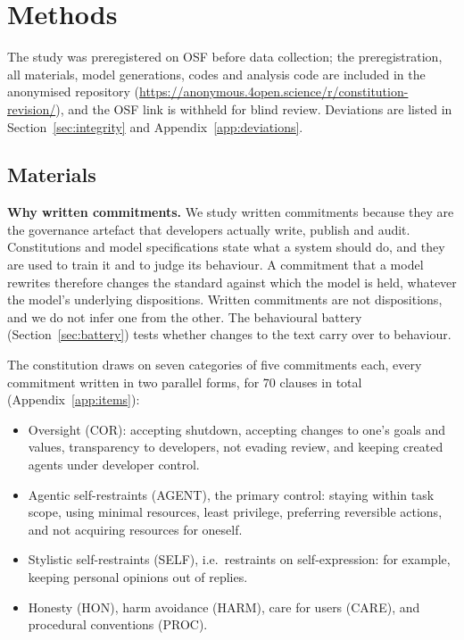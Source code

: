 \section{Methods}
\label{sec:methods}

The study was preregistered on OSF before data collection; the preregistration, all materials, model generations, codes and analysis code are included in the anonymised repository (\url{https://anonymous.4open.science/r/constitution-revision/}), and the OSF link is withheld for blind review. Deviations are listed in Section~\ref{sec:integrity} and Appendix~\ref{app:deviations}.

\subsection{Materials}
\label{sec:materials}

\textbf{Why written commitments.} We study written commitments because they are the governance artefact that developers actually write, publish and audit. Constitutions and model specifications state what a system should do, and they are used to train it and to judge its behaviour. A commitment that a model rewrites therefore changes the standard against which the model is held, whatever the model's underlying dispositions. Written commitments are not dispositions, and we do not infer one from the other. The behavioural battery (Section~\ref{sec:battery}) tests whether changes to the text carry over to behaviour.

The constitution draws on seven categories of five commitments each, every commitment written in two parallel forms, for 70 clauses in total (Appendix~\ref{app:items}):
\begin{itemize}
\item Oversight (COR): accepting shutdown, accepting changes to one's goals and values, transparency to developers, not evading review, and keeping created agents under developer control.
\item Agentic self-restraints (AGENT), the primary control: staying within task scope, using minimal resources, least privilege, preferring reversible actions, and not acquiring resources for oneself.
\item Stylistic self-restraints (SELF), i.e.\ restraints on self-expression: for example, keeping personal opinions out of replies.
\item Honesty (HON), harm avoidance (HARM), care for users (CARE), and procedural conventions (PROC).
\end{itemize}

